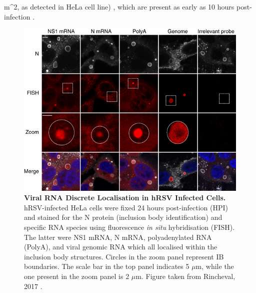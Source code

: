 \mbox{m}^2\), as detected in HeLa cell line) \cite{Rincheval2017FunctionalVirus}, which are present as early as 10 hours post-infection \cite{Jobe2021BovineResponses}.

\begin{figure}
    \centering
    \includegraphics[width=1\linewidth]{04. Introduction/Figs/11. RSV IBs.png}
    \caption[Viral RNA Discrete Localisation in hRSV Infected Cells.]{\textbf{Viral RNA Discrete Localisation in hRSV Infected Cells.} hRSV-infected HeLa cells were fixed 24 hours post-infection (HPI) and stained for the N protein (inclusion body identification) and specific RNA species using fluorescence \textit{in situ} hybridisation (FISH). The latter were NS1 mRNA, N mRNA, polyadenylated RNA (PolyA), and viral genomic RNA which all localised within the inclusion body structures. Circles in the zoom panel represent IB boundaries. The scale bar in the top panel indicates 5 \(\mu\)m, while the one present in the zoom panel is 2 \(\mu\)m. Figure taken from Rincheval, 2017 \cite{Rincheval2017FunctionalVirus}.}
    \label{fig:Viral RNA Discrete Localisation in hRSV Infected Cells}
\end{figure}

